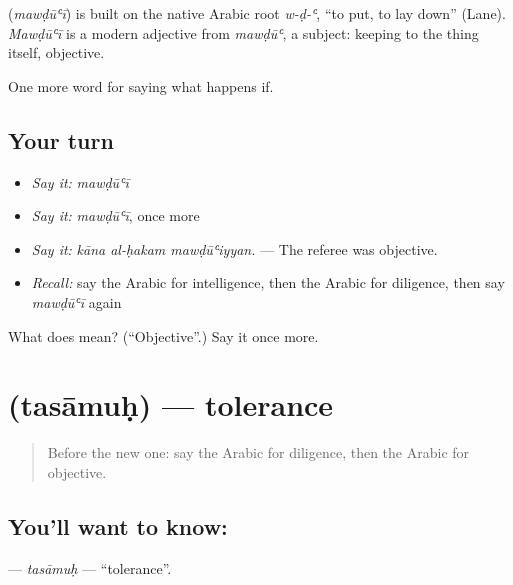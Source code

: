 \begin{cousinweb}
\textbf{} (\emph{mawḍūʿī}) is built on the native Arabic root \emph{w-ḍ-ʿ}, \textquotedblleft{}to put, to lay down\textquotedblright{} (Lane). \emph{Mawḍūʿī} is a modern adjective from \emph{mawḍūʿ}, a subject: keeping to the thing itself, objective.
\end{cousinweb}

\begin{grammarlens}[title={What you've built}]
One more word for saying what happens if.
\end{grammarlens}

\subsection*{Your turn}
\begin{itemize}
\raggedright
  \item \emph{Say it:} \emph{mawḍūʿī}
  \item \emph{Say it:} \emph{mawḍūʿī}, once more
  \item \emph{Say it:} \emph{kāna al-ḥakam mawḍūʿiyyan.} — The referee was objective.
  \item \emph{Recall:} say the Arabic for intelligence, then the Arabic for diligence, then say \emph{mawḍūʿī} again
\end{itemize}

\begin{tcolorbox}[breakable,colback=teal!4,colframe=teal!35!black,title={Before you move on}]
What does  mean? (\textquotedblleft{}Objective\textquotedblright{}.) Say it once more.
\end{tcolorbox}
\section[\texorpdfstring{\ar{تسامح} (tasāmuḥ)}{تسامح (tasāmuḥ)}]{ (tasāmuḥ) — tolerance}

\label{lesson:AR-C422-tasamuh}



\begin{quote}
Before the new one: say the Arabic for diligence, then the Arabic for objective.
\end{quote}

\subsection*{You'll want to know: }
\textbf{} — \emph{tasāmuḥ} — \textquotedblleft{}tolerance\textquotedblright{}.

